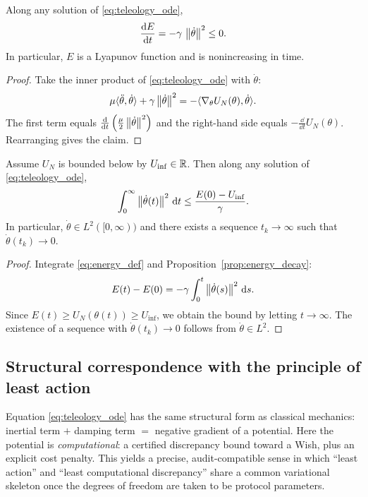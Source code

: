 \begin{proposition}
\label{prop:energy_decay}
Along any solution of \eqref{eq:teleology_ode},
\[
\frac{\mathrm{d} E}{\mathrm{d} t}=-\gamma\,\left\lVert \dot\theta\right\rVert^2\le 0.
\]
In particular, $E$ is a Lyapunov function and is nonincreasing in time.
\end{proposition}

\begin{proof}
Take the inner product of \eqref{eq:teleology_ode} with $\dot\theta$:
\[
\mu\langle \ddot\theta,\dot\theta\rangle+\gamma\left\lVert \dot\theta\right\rVert^2
=-\langle\nabla_\theta U_N(\theta),\dot\theta\rangle.
\]
The first term equals $\frac{\mathrm{d}}{\mathrm{d} t}\left(\frac{\mu}{2}\left\lVert \dot\theta\right\rVert^2\right)$ and the right-hand side equals $-\frac{\dd}{\dd t}U_N(\theta)$.
Rearranging gives the claim.
\end{proof}

\begin{corollary}
\label{cor:finite_dissipation}
Assume $U_N$ is bounded below by $U_{\inf}\in\mathbb{R}$.
Then along any solution of \eqref{eq:teleology_ode},
\[
\int_0^\infty \left\lVert \dot\theta(t)\right\rVert^2\,\mathrm{d} t
\le
\frac{E(0)-U_{\inf}}{\gamma}.
\]
In particular, $\dot\theta\in L^2([0,\infty))$ and there exists a sequence $t_k\to\infty$ such that $\dot\theta(t_k)\to 0$.
\end{corollary}

\begin{proof}
Integrate \eqref{eq:energy_def} and Proposition~\ref{prop:energy_decay}:
\[
E(t)-E(0)=-\gamma\int_0^t \left\lVert \dot\theta(s)\right\rVert^2\,\mathrm{d} s.
\]
Since $E(t)\ge U_N(\theta(t))\ge U_{\inf}$, we obtain the bound by letting $t\to\infty$.
The existence of a sequence with $\dot\theta(t_k)\to 0$ follows from $\dot\theta\in L^2$.
\end{proof}

\subsection{Structural correspondence with the principle of least action}
\label{sec:pla_correspondence}

Equation \eqref{eq:teleology_ode} has the same structural form as classical mechanics:
inertial term $+$ damping term $=$ negative gradient of a potential.
Here the potential is \emph{computational}: a certified discrepancy bound toward a Wish, plus an explicit cost penalty.
This yields a precise, audit-compatible sense in which ``least action'' and ``least computational discrepancy'' share a common variational skeleton once the degrees of freedom are taken to be protocol parameters.


